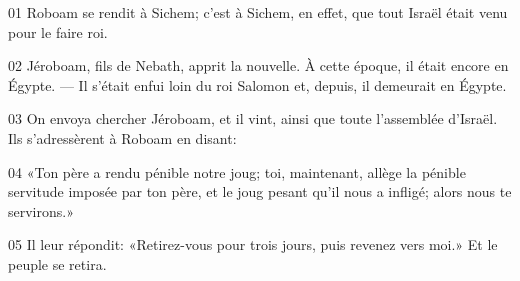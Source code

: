 01 Roboam se rendit à Sichem; c’est à Sichem, en effet, que tout Israël était venu pour le faire roi.

02 Jéroboam, fils de Nebath, apprit la nouvelle. À cette époque, il était encore en Égypte. --- Il s’était enfui loin du roi Salomon et, depuis, il demeurait en Égypte.

03 On envoya chercher Jéroboam, et il vint, ainsi que toute l’assemblée d’Israël. Ils s’adressèrent à Roboam en disant:

04 «Ton père a rendu pénible notre joug; toi, maintenant, allège la pénible servitude imposée par ton père, et le joug pesant qu’il nous a infligé; alors nous te servirons.»

05 Il leur répondit: «Retirez-vous pour trois jours, puis revenez vers moi.» Et le peuple se retira.

